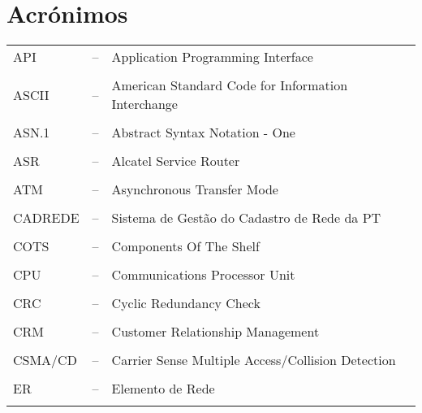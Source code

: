 \label{Acronym}
\section*{Acrónimos}
\vspace{.5cm}
\begin{tiny}
	\begin{tabular}{ l c l }
		API	& –	\hspace{1cm} & Application Programming Interface \\
		\\
		ASCII & – \hspace{1cm} &	American Standard Code for Information Interchange \\
		\\
		ASN.1 & – \hspace{1cm} & Abstract Syntax Notation - One \\
		\\
		ASR & –	\hspace{1cm} & Alcatel Service Router \\
		\\
		ATM & – \hspace{1cm} & Asynchronous Transfer Mode \\
		\\
		CADREDE & –	\hspace{1cm} & Sistema de Gestão do Cadastro de Rede da PT \\
		\\
		COTS & – \hspace{1cm} &Components Of The Shelf \\
		\\
		CPU	& – \hspace{1cm} & Communications Processor Unit \\
		\\
		CRC & – \hspace{1cm} & Cyclic Redundancy Check \\
		\\
		CRM & – \hspace{1cm} & Customer Relationship Management \\
		\\
		CSMA/CD & – \hspace{1cm} & Carrier Sense Multiple Access/Collision Detection \\
		\\
		ER & – \hspace{1cm} & Elemento de Rede \\
		\\

\end{tabular}
\end{tiny}
